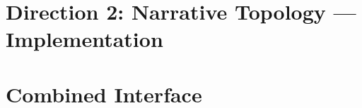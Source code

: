\documentclass[logo,msc]{infthesis}
\begin{document}
\section{Direction 2: Narrative Topology — Implementation}
%
%
%

\section{Combined Interface}
%
%
%
\end{document}
